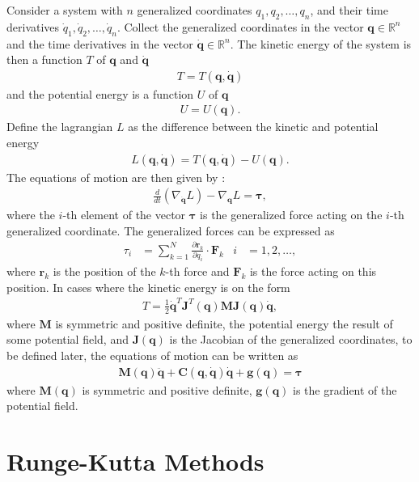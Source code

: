 Consider a system with $n$ generalized coordinates $q_1, q_2, \ldots, q_n$, and
their time derivatives $\dot{q}_1, \dot{q}_2, \ldots, \dot{q}_n$. Collect the
generalized coordinates in the vector $\bm{q} \in \mathbb{R}^n$ and the time
derivatives in the vector $\bm{\dot{q}} \in \mathbb{R}^n$. The kinetic energy
of the system is then a function $T$ of $\bm{q}$ and $\bm{\dot{q}}$
\begin{align}
    T = T(\bm{q}, \bm{\dot{q}})
\end{align}
and the potential energy is a function $U$ of $\bm{q}$
\begin{align}
    U = U(\bm{q}).
\end{align}
Define the lagrangian $L$ as the difference between the kinetic and potential
energy
\begin{align}
    L(\bm{q}, \bm{\dot{q}}) = T(\bm{q}, \bm{\dot{q}}) - U(\bm{q}).
\end{align}
The equations of motion are then given by \cite{modsim}:
\begin{align}
    \frac{d}{dt} \left( \nabla_{\dot{\bm{q}}} L \right) - \nabla_{\bm{q}} L = \bm{\tau},
\end{align}
where the $i$-th element of the vector $\bm{\tau}$ is the generalized force acting
on the $i$-th generalized coordinate. The generalized forces can be expressed as
\begin{align}
    \tau_i &= \sum_{k=1}^N \frac{\partial \bm{r}_k}{\partial q_i} \cdot \bm{F}_k
    & i &= 1, 2, \ldots,
\end{align}
where $\bm{r}_k$ is the position of the $k$-th force and $\bm{F}_k$ is the force
acting on this position. In cases where the kinetic energy is on the form
\begin{align}
    T = \frac{1}{2} \bm{\dot{q}}^T \bm{J}^T(\bm{q}) \bm{M} \bm{J}(\bm{q}) \bm{\dot{q}},
\end{align}
where $\bm{M}$ is symmetric and positive definite, the potential energy the
result of some potential field, and $\bm{J}(\bm{q})$ is the Jacobian of the
generalized coordinates, to be defined later, the equations of motion can be
written as
\begin{align}
    \bm{M}(\bm{q}) \ddot{\bm{q}} + \bm{C}(\bm{q}, \dot{\bm{q}}) \dot{\bm{q}} + \bm{g}(\bm{q}) = \bm{\tau}
\end{align}
where $\bm{M}(\bm{q})$ is symmetric and positive definite, $\bm{g}(\bm{q})$ is the
gradient of the potential field.

\section{Runge-Kutta Methods}
\label{sec:runge-kutta}

